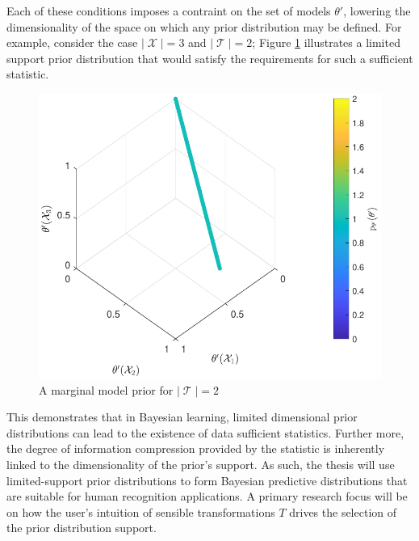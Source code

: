 \documentclass[12pt]{article}
\DeclareMathOperator{\Xcal}{\mathcal{X}}
\DeclareMathOperator{\Tcal}{\mathcal{T}}
\begin{document}
Each of these conditions imposes a contraint on the set of models $\theta'$, lowering the dimensionality of the space on which any prior distribution may be defined. For example, consider the case $|\Xcal| = 3$ and $|\Tcal| = 2$; Figure \ref{fig:P_theta_suff_stat} illustrates a limited support prior distribution that would satisfy the requirements for such a sufficient statistic. 
\begin{figure}
\centering
\includegraphics[width=0.6\linewidth]{P_theta_suff_stat.pdf}
\caption{A marginal model prior for $|\Tcal| = 2$}
\label{fig:P_theta_suff_stat}
\end{figure}
This demonstrates that in Bayesian learning, limited dimensional prior distributions can lead to the existence of data sufficient statistics. Further more, the degree of information compression provided by the statistic is inherently linked to the dimensionality of the prior's support. As such, the thesis will use limited-support prior distributions to form Bayesian predictive distributions that are suitable for human recognition applications. A primary research focus will be on how the user's intuition of sensible transformations $T$ drives the selection of the prior distribution support.
\end{document}
